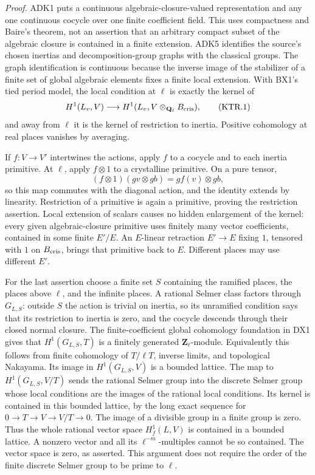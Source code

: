 \emph{Proof.}
ADK1 puts a continuous algebraic-closure-valued representation and
any one continuous cocycle over one finite coefficient field.
This uses compactness and Baire's theorem, not an assertion that
an arbitrary compact subset of the algebraic closure is contained
in a finite extension.  ADK5 identifies the source's chosen
inertias and decomposition-group graphs with the classical groups.
The graph identification is continuous because the inverse image
of the stabilizer of a finite set of global algebraic elements
fixes a finite local extension.  With BX1's tied period model, the
local condition at \(\ell\) is exactly the kernel of
\[
 H^1(L_v,V)\longrightarrow
 H^1(L_v,V\otimes_{\mathbf Q_\ell}B_{\rm cris}),
 \tag{KTR.1}
\]
and away from \(\ell\) it is the kernel of restriction to inertia.
Positive cohomology at real places vanishes by averaging.

If \(f:V\to V'\) intertwines the actions, apply \(f\) to a
cocycle and to each inertia primitive.  At \(\ell\), apply
\(f\otimes1\) to a crystalline primitive.  On a pure tensor,
\[
 (f\otimes1)(g v\otimes g b)=g f(v)\otimes g b,
\]
so this map commutes with the diagonal action, and the identity
extends by linearity.  Restriction of a primitive is again a
primitive, proving the restriction assertion.  Local extension of
scalars causes no hidden enlargement of the kernel: every given
algebraic-closure primitive uses finitely many vector coefficients,
contained in some finite \(E'/E\).  An \(E\)-linear retraction
\(E'\to E\) fixing \(1\), tensored with \(1\) on
\(B_{\rm cris}\), brings that primitive back to \(E\).
Different places may use different \(E'\).

For the last assertion choose a finite set \(S\) containing the
ramified places, the places above \(\ell\), and the infinite
places.  A rational Selmer class factors through \(G_{L,S}\):
outside \(S\) the action is trivial on inertia, so its
unramified condition says that its restriction to inertia is
zero, and the cocycle descends through their closed normal closure.
The finite-coefficient global cohomology foundation in DX1 gives
that \(H^1(G_{L,S},T)\) is a finitely generated
\(\mathbf Z_\ell\)-module.  Equivalently this follows from
finite cohomology of \(T/\ell T\), inverse limits, and
topological Nakayama.  Its image in \(H^1(G_{L,S},V)\) is a
bounded lattice.  The map to \(H^1(G_{L,S},V/T)\) sends the
rational Selmer group into the discrete Selmer group whose local
conditions are the images of the rational local conditions.
Its kernel is contained in this bounded lattice, by the long
exact sequence for \(0\to T\to V\to V/T\to0\).
The image of a divisible group in a finite group is zero.
Thus the whole rational vector space \(H^1_f(L,V)\) is contained
in a bounded lattice.  A nonzero vector and all its
\(\ell^{-m}\)-multiples cannot be so contained.  The vector
space is zero, as asserted.  This argument does not require the
order of the finite discrete Selmer group to be prime to \(\ell\).

